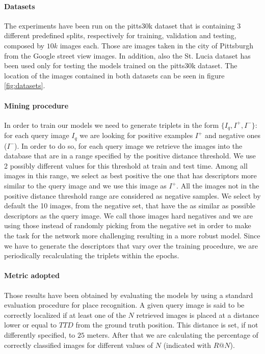 \documentclass[10pt,twocolumn,letterpaper]{article}
\begin{document}
	\paragraph{Datasets}
	The experiments have been run on the pitts30k dataset \cite{NETVLAD} that is containing 3 different predefined splits, respectively for 
	training, validation and testing, composed by $10k$ images each. Those are images taken in the city of Pittsburgh from the Google street
	view images. In addition, also the St. Lucia dataset \cite{st_lucia} has been used only for testing the models trained on the pitts30k dataset.
	The location of the images contained in both datasets can be seen in figure \ref{fig:datasets}.
	
	\paragraph{Mining procedure}
	In order to train our models we need to generate triplets in the form $\{I_q, I^+, I^-\}$: for each query image $I_q$ we are looking for
	positive examples $I^+$ and negative ones ($I^-$). In order to do so, for each query image we retrieve the images into the database that are
	in a range specified by the positive distance threshold. We use 2 possibly different values for this threshold at train and test time.
	Among all images in this range, we select as best positive the one that has descriptors more similar to the query image and we use this image
	as $I^+$. All the images not in the positive distance threshold range are considered as negative samples. We select by default the 10 
	images, from the negative set, that have the as similar as possible descriptors as the query image. We call those images hard negatives and
	we are using those instead of randomly picking from the negative set in order to make the task for the network more challenging resulting in 
	a more robust model. Since we have to generate the descriptors that vary over the training procedure, we are periodically recalculating the 
	triplets within the epochs.
	
	\paragraph{Metric adopted}
	Those results have been obtained by evaluating the models by using a standard evaluation procedure for place recognition.
	A given query image is said to be correctly localized if at least one of the $N$ retrieved images is placed at a distance lower
	or equal to $TTD$ from the ground truth position. This distance is set, if not differently specified, to $25$ meters. After
	that we are calculating the percentage of correctly classified images for different values of $N$ (indicated with $R@N$).  
	
\end{document}
